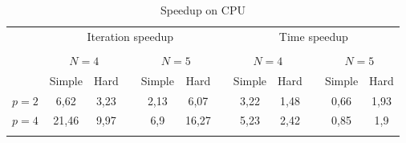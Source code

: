 \documentclass{svproc}
\begin{document}
\begin{table}
                \caption{Speedup on CPU}
                \label{table:average_MMAS_CPU}
                \center
                \begin{tabular}{lccccccccccc}
																	 & \multicolumn{5}{c}{ Iteration speedup} & & \multicolumn{5}{c}{ Time speedup}\\
                               \noalign{\smallskip} \cline{2-6} \cline{8-12}  \\
                                   & \multicolumn{2}{c}{ $N=4$ } & & \multicolumn{2}{c}{$N=5$} &  & \multicolumn{2}{c}{ $N=4$ } & & \multicolumn{2}{c}{$N=5$} \\
                               \noalign{\smallskip} \cline{2-3} \cline{5-6}  \cline{8-9} \cline{11-12} \noalign{\smallskip}
                               & Simple & Hard & & Simple & Hard &  & Simple & Hard & & Simple & Hard  \\
                               \noalign{\smallskip} \hline \noalign{\smallskip}                               
                               $p=2$&    6,62  & 3,23  &   & 2,13 & 6,07  &   & 3,22 & 1,48 &   & 0,66 & 1,93 \\
                               $p=4$&    21,46 &  9,97 &   & 6,9  & 16,27 &   & 5,23 & 2,42 &   & 0,85 & 1,9 \\
                               \noalign{\smallskip}\hline
                \end{tabular}
\end{table}

   
   
\end{document}
